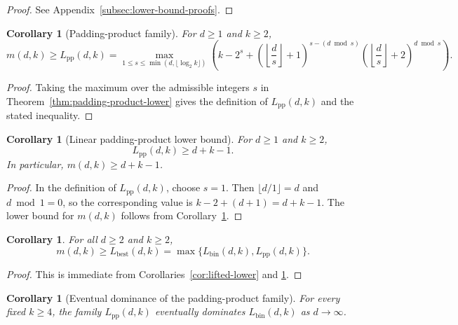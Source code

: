 \documentclass[11pt]{article}
\theoremstyle{plain}
\newtheorem{corollary}[theorem]{Corollary}
\theoremstyle{definition}
\theoremstyle{remark}
\numberwithin{equation}{section}
\begin{document}
\begin{proof}
See Appendix~\ref{subsec:lower-bound-proofs}.
\end{proof}

\begin{corollary}[Padding-product family]\label{cor:padding-product-family}
For $d\ge1$ and $k\ge2$,
\[
m(d,k)\ge L_{\mathrm{pp}}(d,k)=
\max_{1\le s\le \min(d,\lfloor \log_2 k\rfloor)}
\left(k-2^s+\left(\left\lfloor\frac{d}{s}\right\rfloor+1\right)^{s-(d\bmod s)}\left(\left\lfloor\frac{d}{s}\right\rfloor+2\right)^{d\bmod s}\right).
\]
\end{corollary}

\begin{proof}
Taking the maximum over the admissible integers $s$ in Theorem~\ref{thm:padding-product-lower} gives the definition of $L_{\mathrm{pp}}(d,k)$ and the stated inequality.
\end{proof}

\begin{corollary}[Linear padding-product lower bound]\label{cor:linear-padding-lower}
For $d\ge1$ and $k\ge2$,
\[
L_{\mathrm{pp}}(d,k)\ge d+k-1.
\]
In particular, $m(d,k)\ge d+k-1$.
\end{corollary}

\begin{proof}
In the definition of $L_{\mathrm{pp}}(d,k)$, choose $s=1$. Then $\lfloor d/1\rfloor=d$ and $d\bmod 1=0$, so the corresponding value is $k-2+(d+1)=d+k-1$. The lower bound for $m(d,k)$ follows from Corollary~\ref{cor:padding-product-family}.
\end{proof}

\begin{corollary}\label{cor:best-lower}
For all $d\ge 2$ and $k\ge 2$,
\[
m(d,k)\ge L_{\mathrm{best}}(d,k)=\max\bigl\{L_{\mathrm{bin}}(d,k),L_{\mathrm{pp}}(d,k)\bigr\}.
\]
\end{corollary}

\begin{proof}
This is immediate from Corollaries~\ref{cor:lifted-lower} and \ref{cor:padding-product-family}.
\end{proof}

\begin{corollary}[Eventual dominance of the padding-product family]\label{cor:pp-eventual-dominance}
For every fixed $k\ge 4$, the family $L_{\mathrm{pp}}(d,k)$ eventually dominates $L_{\mathrm{bin}}(d,k)$ as $d\to\infty$.
\end{corollary}
\end{document}
